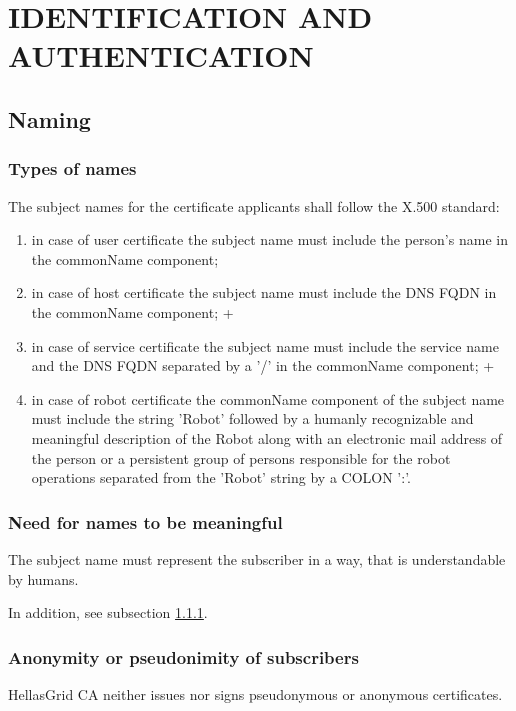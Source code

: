 
\chapter{IDENTIFICATION AND AUTHENTICATION}
\section{Naming}
\subsection{Types of names}
\label{sub:TypesOfNames}

The subject names for the certificate applicants shall follow the X.500 standard:

\begin{enumerate}
\item{in case of user certificate the subject name must include the person's name in the commonName component;}
\item{in case of host certificate the subject name must include the DNS FQDN in the commonName component;}
+\item{in case of service certificate the subject name must include the service name and the DNS FQDN separated by a '/' in the commonName component;}
+\item{in case of robot certificate the commonName component of the subject name must include the string 'Robot' followed by a humanly recognizable and meaningful description of the Robot along with an electronic mail address of the person or a persistent group of persons responsible for the robot operations separated from the 'Robot' string  by a COLON ':'.}
\end{enumerate}

\subsection{Need for names to be meaningful}

The subject name must represent the subscriber in a way, that is understandable by humans.

In addition, see subsection \ref{sub:TypesOfNames}.

\subsection{Anonymity or pseudonimity of subscribers}

HellasGrid CA neither issues nor signs pseudonymous or anonymous certificates.

